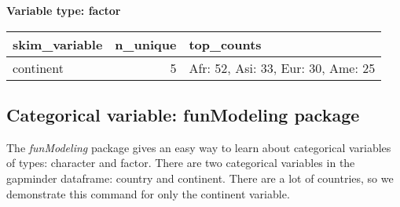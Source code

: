 \documentclass[
]{book}
\newenvironment{Shaded}{\begin{snugshade}}{\end{snugshade}}
\newcommand{\CommentTok}[1]{\textcolor[rgb]{0.56,0.35,0.01}{\textit{#1}}}
\newcommand{\DecValTok}[1]{\textcolor[rgb]{0.00,0.00,0.81}{#1}}
\newcommand{\KeywordTok}[1]{\textcolor[rgb]{0.13,0.29,0.53}{\textbf{#1}}}
\newcommand{\NormalTok}[1]{#1}
\newcommand{\OperatorTok}[1]{\textcolor[rgb]{0.81,0.36,0.00}{\textbf{#1}}}
\newcommand{\StringTok}[1]{\textcolor[rgb]{0.31,0.60,0.02}{#1}}
\begin{document}
\begin{Shaded}
\end{Shaded}

\textbf{Variable type: factor}

\begin{tabular}{l|r|l}
\hline
skim\_variable & n\_unique & top\_counts\\
\hline
continent & 5 & Afr: 52, Asi: 33, Eur: 30, Ame: 25\\
\hline
\end{tabular}

\hypertarget{categorical-variable-funmodeling-package}{%
\subsection{Categorical variable: funModeling package}\label{categorical-variable-funmodeling-package}}

The \emph{funModeling} package gives an easy way to learn about categorical variables of types: character and factor. There are two categorical variables in the gapminder
dataframe: country and continent. There are a lot of countries, so we demonstrate
this command for only the continent variable.

\begin{Shaded}
\end{Shaded}
\end{document}
